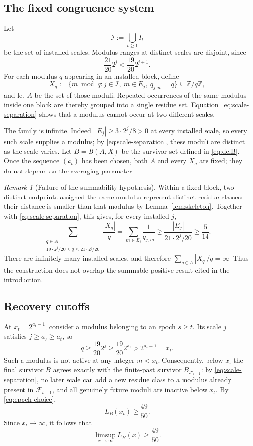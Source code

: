 \documentclass[11pt]{article}
\numberwithin{equation}{section}
\theoremstyle{definition}
\theoremstyle{remark}
\newtheorem{remark}[theorem]{Remark}
\newcommand{\Z}{\mathbb Z}
\newcommand{\cI}{\mathcal I}
\begin{document}
\subsection{The fixed congruence system}

Let
\[
 \cI:=\bigcup_{t\ge1}I_t
\]
be the set of installed scales.  Modulus ranges at distinct scales are
disjoint, since
\begin{equation}\label{eq:scale-separation}
 \frac{21}{20}2^j<\frac{19}{20}2^{j+1}.
\end{equation}
For each modulus \(q\) appearing in an installed block, define
\[
 X_q:=\{m\bmod q:j\in\cI,\ m\in E_j,\ q_{j,m}=q\}
 \subseteq\Z/q\Z,
\]
and let \(A\) be the set of those moduli.  Repeated occurrences of the same
modulus inside one block are thereby grouped into a single residue set.
Equation~\eqref{eq:scale-separation} shows that a modulus cannot occur at
two different scales.

The family is infinite.  Indeed, \(|E_j|\ge3\cdot2^j/8>0\) at every
installed scale, so every such scale supplies a modulus; by
\eqref{eq:scale-separation}, these moduli are distinct as the scale varies.
Let \(B=B(A,X)\) be the survivor set defined in \eqref{eq:defB}.  Once the
sequence \((a_t)\) has been chosen, both \(A\) and every \(X_q\) are fixed;
they do not depend on the averaging parameter.

\begin{remark}[Failure of the summability hypothesis]\label{rem:nonsummable}
Within a fixed block, two distinct endpoints assigned the same modulus
represent distinct residue classes: their distance is smaller than that
modulus by Lemma~\ref{lem:skeleton}.  Together with
\eqref{eq:scale-separation}, this gives, for every installed \(j\),
\[
 \sum_{\substack{q\in A\\19\cdot2^j/20\le q\le21\cdot2^j/20}}
       \frac{|X_q|}{q}
 =\sum_{m\in E_j}\frac1{q_{j,m}}
 \ge\frac{|E_j|}{21\cdot2^j/20}
 \ge\frac5{14}.
\]
There are infinitely many installed scales, and therefore
\(\sum_{q\in A}|X_q|/q=\infty\).  Thus the construction does not overlap
the summable positive result cited in the introduction.
\end{remark}

\subsection{Recovery cutoffs}

At \(x_t=2^{a_t-1}\), consider a modulus belonging to an epoch \(s\ge t\).
Its scale \(j\) satisfies \(j\ge a_s\ge a_t\), so
\[
 q\ge\frac{19}{20}2^j
 \ge\frac{19}{20}2^{a_t}
 >2^{a_t-1}=x_t.
\]
Such a modulus is not active at any integer \(m<x_t\).  Consequently, below
\(x_t\) the final survivor \(B\) agrees exactly with the finite-past
survivor \(B_{\mathcal F_{t-1}}\): by
\eqref{eq:scale-separation}, no later scale can add a new residue class to
a modulus already present in \(\mathcal F_{t-1}\), and all genuinely future
moduli are inactive below \(x_t\).  By \eqref{eq:epoch-choice},
\[
 L_B(x_t)\ge\frac{49}{50}.
\]
Since \(x_t\to\infty\), it follows that
\begin{equation}\label{eq:limsup}
 \limsup_{x\to\infty}L_B(x)\ge\frac{49}{50}.
\end{equation}
\end{document}
